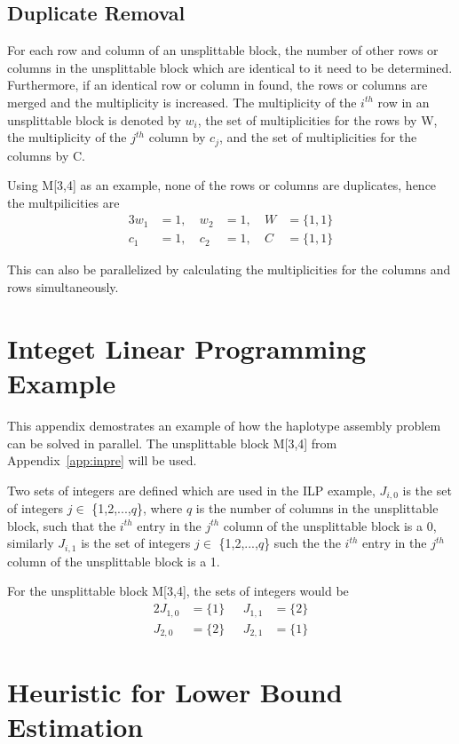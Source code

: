 \documentclass[10pt,a4paer,twocolumn]{article}
\begin{document}
\subsection{Duplicate Removal}

For each row and column of an unsplittable block, the number of other rows or columns in the unsplittable
block which are identical to it need to be determined. Furthermore, if an identical row or column in found,
the rows or columns are merged and the multiplicity is increased. The multiplicity of the $i^{th}$ row in an
unsplittable block is denoted by $w_i$, the set of multiplicities for the rows by W, the multiplicity of the
$j^{th}$ column by $c_j$, and the set of multiplicities for the columns by C.

Using M[3,4] as an example, none of the rows or columns are duplicates, hence the multpilicities are
\begin{alignat*}{3}
    w_1 &= 1, & \ w_2 &= 1, & \ W &= \{1, 1\} \\
    c_1 &= 1, & \ c_2 &= 1, & \ C &= \{1, 1\}
\end{alignat*}

This can also be parallelized by calculating the multiplicities for the columns and rows simultaneously.

\section{Integet Linear Programming Example} \label{app:ilpex}

This appendix demostrates an example of how the haplotype assembly problem can be solved in parallel. The
unsplittable block M[3,4] from Appendix~\ref{app:inpre} will be used.

Two sets of integers are defined which are used in the ILP example, $J_{i,0}$ is the set of integers $j \in$
\{1,2,...,$q$\}, where $q$ is the number of columns in the unsplittable block, such that the $i^{th}$ entry in
the $j^{th}$ column of the unsplittable block is a 0, similarly $J_{i,1}$ is the set of integers $j \in$
\{1,2,...,$q$\} such the the $i^{th}$ entry in the $j^{th}$ column of the unsplittable block is a 1. 

For the unsplittable block M[3,4], the sets of integers would be 
\begin{alignat*}{2}
    J_{1,0} &= \{1\}     & \ \ \  J_{1,1} &= \{2\}        \\
    J_{2,0} &= \{2\}     & \ \ \  J_{2,1} &= \{1\}   
\end{alignat*}

\section{Heuristic for Lower Bound Estimation}
\end{document}
